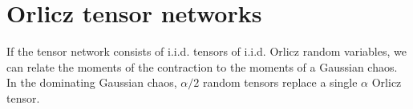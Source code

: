 \section{Orlicz tensor networks}

If the tensor network consists of i.i.d. tensors of i.i.d. Orlicz random variables, we can relate the moments of the contraction to the moments of a Gaussian chaos.
In the dominating Gaussian chaos, $\alpha/2$ random tensors replace a single $\alpha$ Orlicz tensor.